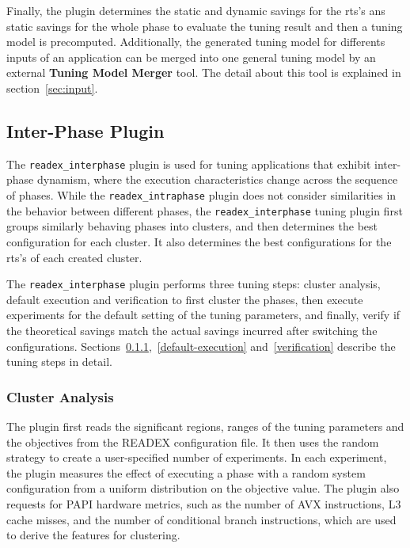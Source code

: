 Finally, the plugin determines the static and dynamic savings for the rts's ans static savings for the whole phase to evaluate the tuning result and then a tuning model is precomputed. Additionally, the generated tuning model for differents inputs of an application can be merged into one general tuning model by an external \textbf{Tuning Model Merger} tool. The detail about this tool is explained in section~\ref{sec:input}. 
 
\subsection{Inter-Phase Plugin} \label{sec:inter-phase}
The \texttt{readex\_interphase} plugin  is used for tuning applications that exhibit inter-phase dynamism, where the execution characteristics change across the sequence of phases. While the \texttt{readex\_intraphase} plugin does not consider similarities in the behavior between different phases, the \texttt{readex\_interphase} tuning plugin first groups similarly behaving phases into clusters, and then determines the best configuration for each cluster. It also determines the best configurations for the rts's of each created cluster.

The \texttt{readex\_interphase} plugin performs three tuning steps: cluster analysis, default execution and verification to first cluster the phases, then execute experiments for the default setting of the tuning parameters, and finally, verify if the theoretical savings match the actual savings incurred after switching the configurations. Sections~\ref{cluster-analysis},~\ref{default-execution} and~\ref{verification} describe the tuning steps in detail.

\subsubsection{Cluster Analysis} \label{cluster-analysis} 
The plugin first reads the significant regions, ranges of the tuning parameters and the objectives from the READEX configuration file. It then uses the random strategy to create a user-specified number of experiments. In each experiment, the plugin measures the effect of executing a phase with a random system configuration from a uniform distribution  on the objective value. The plugin also requests for PAPI hardware metrics, such as the number of AVX instructions, L3 cache misses, and the number of conditional branch instructions, which are used to derive the features for clustering.

